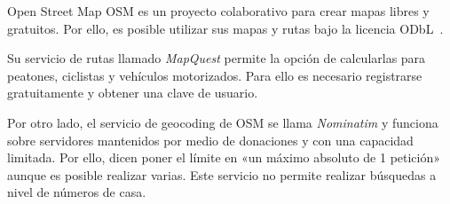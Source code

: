 \begin{definitionlist}
  \item[Open Street Map] \acs{OSM} es un proyecto colaborativo para crear mapas libres y
    gratuitos. Por ello, es posible utilizar sus mapas y rutas bajo la licencia
    ODbL~\cite{LicenciaOSM}.

    Su servicio de rutas llamado \emph{MapQuest} permite la opción de calcularlas para peatones,
    ciclistas y vehículos motorizados. Para ello es necesario registrarse gratuitamente y obtener
    una clave de usuario.

    Por otro lado, el servicio de geocoding de \acs{OSM} se llama \emph{Nominatim} y funciona sobre
    servidores mantenidos por medio de donaciones y con una capacidad limitada. Por ello, dicen
    poner el límite en «un máximo absoluto de 1 petición»~\cite{Nominatim} aunque es posible
    realizar varias. Este servicio no permite realizar búsquedas a nivel de números de casa.
 
\end{definitionlist}

